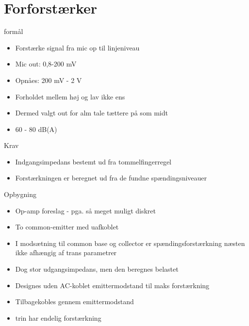 \documentclass{beamer}
\begin{document}

\section{Forforstærker}
\begin{frame}{formål}
\begin{itemize}
\item Forstærke signal fra mic op til linjeniveau
\item Mic out: 0,8-200 mV
\item Opnåes: 200 mV - 2 V
\item Forholdet mellem høj og lav ikke ens
\item Dermed valgt out for alm tale tættere på som midt
\item 60 - 80 dB(A)
\end{itemize}
\end{frame}


\begin{frame}{Krav}
\begin{itemize}
\item Indgangsimpedans bestemt ud fra tommelfingerregel
\item Forstærkningen er beregnet ud fra de fundne spændingsniveauer 
\end{itemize}
\end{frame}



\begin{frame}{Opbygning}
\begin{itemize}
\item Op-amp foreslag - pga. så meget muligt diskret
\item To common-emitter med uafkoblet
\item I modsætning til common base og collector er spændingsforstærkning næsten ikke afhængig af trans parametrer
\item Dog stor udgangsimpedans, men den beregnes belastet
\item Designes uden AC-koblet emittermodstand til maks forstærkning 
\item Tilbagekobles gennem emittermodstand
\item trin har endelig forstærkning
\end{itemize}
\end{frame}
\end{document}
